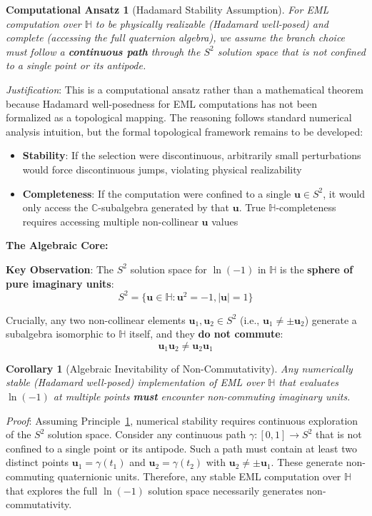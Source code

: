 \documentclass[11pt]{article}
\newtheorem{corollary}[theorem]{Corollary}
\newtheorem{principle}[theorem]{Computational Ansatz}
\providecommand{\tightlist}{%
  \setlength{\itemsep}{0pt}\setlength{\parskip}{0pt}}
\begin{document}
\begin{principle}[Hadamard Stability Assumption]\label{principle:stability}
For EML computation over \(\mathbb{H}\) to be physically realizable (Hadamard well-posed) and complete (accessing the full quaternion algebra), we \textit{assume} the branch choice must follow a \textbf{continuous path} through the \(S^2\) solution space that is not confined to a single point or its antipode.
\end{principle}

\emph{Justification}: This is a computational ansatz rather than a mathematical theorem because Hadamard well-posedness for EML computations has not been formalized as a topological mapping. The reasoning follows standard numerical analysis intuition, but the formal topological framework remains to be developed:
\begin{itemize}
\tightlist
\item
  \textbf{Stability}: If the selection were discontinuous, arbitrarily small perturbations would force discontinuous jumps, violating physical realizability
\item
  \textbf{Completeness}: If the computation were confined to a single \(\mathbf{u} \in S^2\), it would only access the \(\mathbb{C}\)-subalgebra generated by that \(\mathbf{u}\). True \(\mathbb{H}\)-completeness requires accessing multiple non-collinear \(\mathbf{u}\) values
\end{itemize}

\textbf{The Algebraic Core:}

\textbf{Key Observation}: The \(S^2\) solution space for \(\ln(-1)\) in \(\mathbb{H}\) is the \textbf{sphere of pure imaginary units}: \[S^2 = \{\mathbf{u} \in \mathbb{H} : \mathbf{u}^2 = -1, |\mathbf{u}| = 1\}\]

Crucially, any two non-collinear elements \(\mathbf{u}_1, \mathbf{u}_2 \in S^2\) (i.e., \(\mathbf{u}_1 \neq \pm \mathbf{u}_2\)) generate a subalgebra isomorphic to \(\mathbb{H}\) itself, and they \textbf{do not commute}: \[\mathbf{u}_1\mathbf{u}_2 \neq \mathbf{u}_2\mathbf{u}_1\]

\begin{corollary}[Algebraic Inevitability of Non-Commutativity]\label{cor:non-comm}
Any numerically stable (Hadamard well-posed) implementation of EML over \(\mathbb{H}\) that evaluates \(\ln(-1)\) at multiple points \textbf{must} encounter non-commuting imaginary units.
\end{corollary}

\emph{Proof}: Assuming Principle~\ref{principle:stability}, numerical stability requires continuous exploration of the \(S^2\) solution space. Consider any continuous path \(\gamma: [0,1] \to S^2\) that is not confined to a single point or its antipode. Such a path must contain at least two distinct points \(\mathbf{u}_1 = \gamma(t_1)\) and \(\mathbf{u}_2 = \gamma(t_2)\) with \(\mathbf{u}_2 \neq \pm \mathbf{u}_1\). These generate non-commuting quaternionic units. Therefore, any stable EML computation over \(\mathbb{H}\) that explores the full \(\ln(-1)\) solution space necessarily generates non-commutativity.
\end{document}

